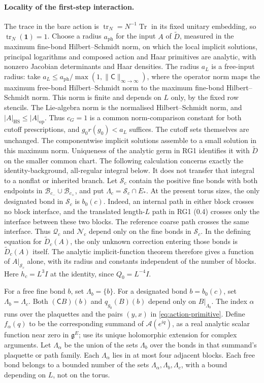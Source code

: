 \documentclass[11pt]{article}
\newcommand{\tr}{\operatorname{tr}}
\newcommand{\id}{\mathbf 1}
\begin{document}
\paragraph{Locality of the first-step interaction.}
The trace in the bare action is $\tr_N=N^{-1}\operatorname{Tr}$ in its fixed unitary embedding, so $\tr_N(\id)=1$. Choose a radius $a_{\mathrm{ph}}$ for the input $A$ of $\widetilde D$, measured in the maximum fine-bond Hilbert--Schmidt norm, on which the local implicit solutions, principal logarithms and composed action and Haar primitives are analytic, with nonzero Jacobian determinants and Haar densities. The radius $a_L$ is a free-input radius: take $a_L\leq a_{\mathrm{ph}}/\max(1,\|\mathsf C\|_{\infty\to\infty})$, where the operator norm maps the maximum free-bond Hilbert--Schmidt norm to the maximum fine-bond Hilbert--Schmidt norm. This norm is finite and depends on $L$ only, by the fixed row stencils. The Lie-algebra norm is the normalised Hilbert--Schmidt norm, and $|A|_{\mathrm{HS}}\leq|A|_{\mathrm{op}}$. Thus $c_G=1$ is a common norm-comparison constant for both cutoff prescriptions, and $g_0r(g_0)<a_L$ suffices. The cutoff sets themselves are unchanged. The componentwise implicit solutions assemble to a small solution in this maximum norm. Uniqueness of the analytic germ in RG1 identifies it with $\widetilde D$ on the smaller common chart.
The following calculation concerns exactly the identity-background, all-regular integral below. It does not transfer that integral to a nonflat or inherited branch. Let $\mathcal S_c$ contain the positive fine bonds with both endpoints in $\mathcal B_{c_-}\cup\mathcal B_{c_+}$, and put $\Lambda_c=\mathcal S_c\cap E_*$. At the present torus sizes, the only designated bond in $\mathcal S_c$ is $b_0(c)$. Indeed, an internal path in either block crosses no block interface, and the translated length-$L$ path in RG1 (0.4) crosses only the interface between these two blocks. The reference coarse path crosses the same interface. Thus $\mathcal Q_c$ and $\mathcal N_c$ depend only on the fine bonds in $\mathcal S_c$. In the defining equation for $\widetilde D_c(A)$, the only unknown correction entering those bonds is $\widetilde D_c(A)$ itself. The analytic implicit-function theorem therefore gives a function of $A|_{\mathcal S_c}$ alone, with its radius and constants independent of the number of blocks. Here $h_c=L^3I$ at the identity, since $Q_0=L^{-4}I$.

For a free fine bond $b$, set $\Lambda_b=\{b\}$. For a designated bond $b=b_0(c)$, set $\Lambda_b=\Lambda_c$. Both $(\mathsf CB)(b)$ and $q_{g_0}(B)(b)$ depend only on $B|_{\Lambda_b}$. The index $\alpha$ runs over the plaquettes and the pairs $(y,x)$ in \eqref{eq:action-primitive}. Define $f_\alpha(q)$ to be the corresponding summand of $\mathscr A(e^{iq})$, as a real analytic scalar function near zero in $\mathfrak g^E$; use its unique holomorphic extension for complex arguments. Let $\Lambda_\alpha$ be the union of the sets $\Lambda_b$ over the bonds in that summand's plaquette or path family. Each $\Lambda_\alpha$ lies in at most four adjacent blocks. Each free bond belongs to a bounded number of the sets $\Lambda_\alpha,\Lambda_b,\Lambda_c$, with a bound depending on $L$, not on the torus.
\end{document}

